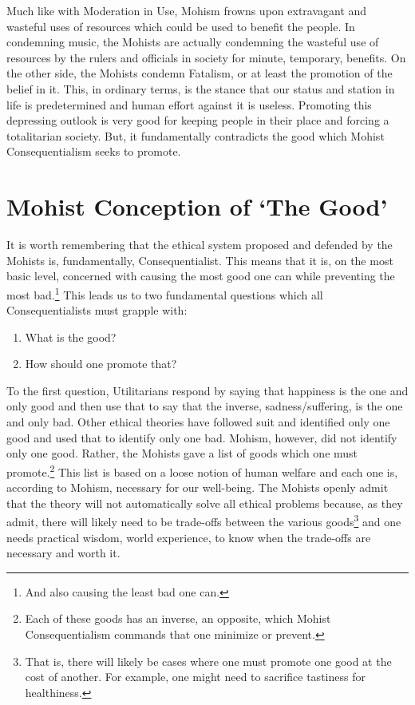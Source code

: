 Much like with Moderation in Use, Mohism frowns upon extravagant and wasteful uses of resources which could be used to benefit the people. In condemning music, the Mohists are actually condemning the wasteful use of resources by the rulers and officials in society for minute, temporary, benefits. On the other side, the Mohists condemn Fatalism, or at least the promotion of the belief in it. This, in ordinary terms, is the stance that our status and station in life is predetermined and human effort against it is useless. Promoting this depressing outlook is very good for keeping people in their place and forcing a totalitarian society. But, it fundamentally contradicts the good which Mohist Consequentialism seeks to promote.

\section{Mohist Conception of `The Good'}

It is worth remembering that the ethical system proposed and defended by the Mohists is, fundamentally, Consequentialist. This means that it is, on the most basic level, concerned with causing the most good one can while preventing the most bad.\footnote{And also causing the least bad one can.} This leads us to two fundamental questions which all Consequentialists must grapple with: 

\begin{enumerate}
\item What is the good?
\item How should one promote that?
\end{enumerate}

To the first question, Utilitarians respond by saying that happiness is the one and only good and then use that to say that the inverse, sadness/suffering, is the one and only bad. Other ethical theories have followed suit and identified only one good and used that to identify only one bad. Mohism, however, did not identify only one good. Rather, the Mohists gave a list of goods which one must promote.\footnote{Each of these goods has an inverse, an opposite, which Mohist Consequentialism commands that one minimize or prevent.} This list is based on a loose notion of human welfare and each one is, according to Mohism, necessary for our well-being. The Mohists openly admit that the theory will not automatically solve all ethical problems because, as they admit, there will likely need to be trade-offs between the various goods\footnote{That is, there will likely be cases where one must promote one good at the cost of another. For example, one might need to sacrifice tastiness for healthiness.} and one needs practical wisdom, world experience, to know when the trade-offs are necessary and worth it.  

